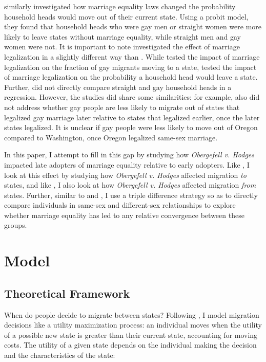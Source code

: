 \documentclass[12pt,letterpaper]{article}
\begin{document}
\citet{12} similarly investigated how marriage equality laws changed the probability household heads would move out of their current state. Using a probit model, they found that household heads who were gay men or straight women were more likely to leave states without marriage equality, while straight men and gay women were not. It is important to note \citet{12}  investigated the effect of marriage legalization in a slightly different way than \citet{1}. While \citet{1} tested the impact of marriage legalization on the fraction of gay migrants moving to a state, \citet{12} tested the impact of marriage legalization on the probability a household head would leave a state. Further, \citet{12} did not directly compare straight and gay household heads in a regression. However, the studies did share some similarities: for example, \citet{12} also did not address whether gay people are less likely to migrate out of states that legalized gay marriage later relative to states that legalized earlier, once the later states legalized. It is unclear if gay people were less likely to move out of Oregon compared to Washington, once Oregon legalized same-sex marriage.

In this paper, I attempt to fill in this gap by studying how \textit{Obergefell v. Hodges} impacted late adopters of marriage equality relative to early adopters. Like \citet{1}, I look at this effect by studying how \textit{Obergefell v. Hodges} affected migration \textit{to} states, and like \citet{12}, I also look at how \textit{Obergefell v. Hodges} affected migration \textit{from} states. Further, similar to \citet{3} and \citet{30}, I use a triple difference strategy so as to directly compare individuals in same-sex and different-sex relationships to explore whether marriage equality has led to any relative convergence between these groups.

\section{Model}
\subsection{Theoretical Framework}
When do people decide to migrate between states? Following \citet{12}, I model migration decisions like a utility maximization process: an individual moves when the utility of a possible new state is greater than their current state, accounting for moving costs. The utility of a given state depends on the individual making the decision and the characteristics of the state:
\end{document}
